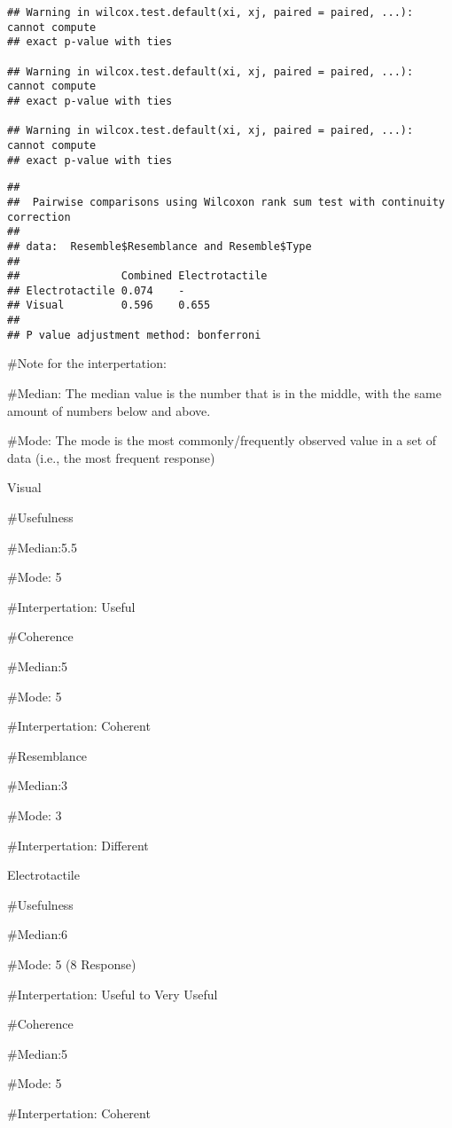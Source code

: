 \documentclass[
]{article}
\begin{document}
\begin{verbatim}
## Warning in wilcox.test.default(xi, xj, paired = paired, ...): cannot compute
## exact p-value with ties

## Warning in wilcox.test.default(xi, xj, paired = paired, ...): cannot compute
## exact p-value with ties

## Warning in wilcox.test.default(xi, xj, paired = paired, ...): cannot compute
## exact p-value with ties
\end{verbatim}

\begin{verbatim}
## 
##  Pairwise comparisons using Wilcoxon rank sum test with continuity correction 
## 
## data:  Resemble$Resemblance and Resemble$Type 
## 
##                Combined Electrotactile
## Electrotactile 0.074    -             
## Visual         0.596    0.655         
## 
## P value adjustment method: bonferroni
\end{verbatim}

\#Note for the interpertation:

\#Median: The median value is the number that is in the middle, with the
same amount of numbers below and above.

\#Mode: The mode is the most commonly/frequently observed value in a set
of data (i.e., the most frequent response)

Visual

\#Usefulness

\#Median:5.5

\#Mode: 5

\#Interpertation: Useful

\#Coherence

\#Median:5

\#Mode: 5

\#Interpertation: Coherent

\#Resemblance

\#Median:3

\#Mode: 3

\#Interpertation: Different

Electrotactile

\#Usefulness

\#Median:6

\#Mode: 5 (8 Response)

\#Interpertation: Useful to Very Useful

\#Coherence

\#Median:5

\#Mode: 5

\#Interpertation: Coherent
\end{document}

